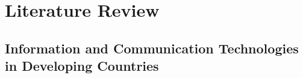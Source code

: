 \chapter{Literature Review}

\section{Information and Communication Technologies in Developing Countries}
